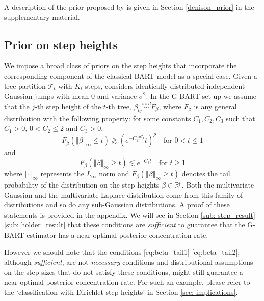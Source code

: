 \documentclass[12pt]{article}
\newcommand{\mT}{\mathcal{T}}
\newcommand{\norm}[1]{\left\Vert#1\right\Vert}
\newcommand{\1}{\mathbb{I}}
\theoremstyle{plain}
\theoremstyle{definition}
\theoremstyle{remark}
\begin{document}
A description of the prior proposed by \cite{denison1998bayesian} is given in Section \ref{denison_prior} in the supplementary material.
\subsection{\bf Prior on step heights}\label{sub:prior_step} 
We impose a broad class of priors on the step heights that incorporate the corresponding component of the classical BART model as a special case. Given a tree partition $\mT_t$ with $K_t$ steps, \cite{chipman2010bart} considers identically distributed independent Gaussian jumps with mean $0$ and variance $\sigma^2$. In the G-BART set-up we assume that the $j$-th step height of the $t$-th tree, $\beta_{tj} \stackrel{i.i.d}{\sim} F_\beta$, where $F_\beta$ is any general distribution with the following property: for some constants $C_1, C_2, C_3$ such that $C_1>0$, $0 < C_2 \le 2$ and $C_3 > 0$,
\begin{equation}\label{eq:beta_tail1}
    F_\beta(\norm{\beta}_\infty \le t) \gtrsim \left (e^{-C_1 t^{C_2}} t \right)^{p} \quad \text{for $0< t \le 1$}
\end{equation}
and
\begin{equation}\label{eq:beta_tail2}
    F_\beta(\norm{\beta}_\infty \ge t) \lesssim e^{-C_3 t} \quad \text{for $t \ge 1$}
\end{equation}
where $\norm{\cdot}_\infty$ represents the $L_\infty$ norm and $F_\beta(\norm{\beta}_\infty \ge t)$ denotes the tail probability of the distribution on the step heights $\beta \in \mathbb{R}^p$. Both the multivariate Gaussian and the multivariate Laplace distribution come from this family of distributions and so do any sub-Gaussian distributions. A proof of these statements is provided in the appendix. We will see in Section \ref{sub: step_result} - \ref{sub: holder_result} that these conditions are {\it sufficient} to guarantee that the G-BART estimator has a near-optimal posterior concentration rate.

However we should note that the conditions \eqref{eq:beta_tail1}-\eqref{eq:beta_tail2}, although {\it sufficient}, are not {\it necessary} conditions and distributional assumptions on the step sizes that do not satisfy these conditions, might still guarantee a near-optimal posterior concentration rate. For such an example, please refer to the `classification with Dirichlet step-heights' in Section \ref{sec: implications}.
\end{document}
